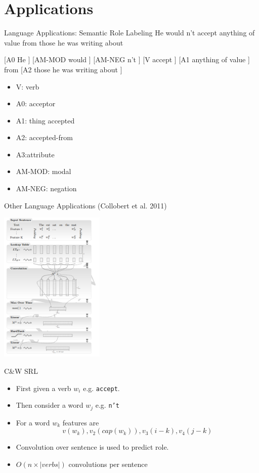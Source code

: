 \documentclass{beamer}
\begin{document}
\section{Applications}


\begin{frame}{Language Applications: Semantic Role Labeling }
 He  would  n't accept anything of value from those he was writing about  

 \air 

 [A0 He ] [AM-MOD would ] [AM-NEG n't ] [V accept ] [A1 anything of value ] from [A2 those he was writing about ] 

\begin{itemize}
  \item V: verb 
   \item A0: acceptor 
   \item A1: thing accepted 
   \item A2: accepted-from 
   \item A3:attribute 
   \item AM-MOD: modal 
     \item  AM-NEG: negation
\end{itemize}
\end{frame}

\begin{frame}{Other Language Applications (Collobert et al. 2011) }
  \begin{center}
    \includegraphics[width=5cm]{cwconv}
  \end{center}
\end{frame}

\begin{frame}{C\&W SRL }
  \begin{itemize}
  \item   First given a verb $w_i$ e.g. \texttt{accept}.
    \air 
  \item  Then consider a word $w_j$ e.g. \texttt{n't}
    \air
  \item  For a word $w_k$ features are 
    \[v(w_k), v_2(cap(w_k)), v_3(i-k), v_4(j-k)\]

    \air
  \item Convolution over sentence is used to predict role.
    \air 
  \item $O(n \times |verbs|)$ convolutions per sentence
  \end{itemize}
\end{frame}
\end{document}
